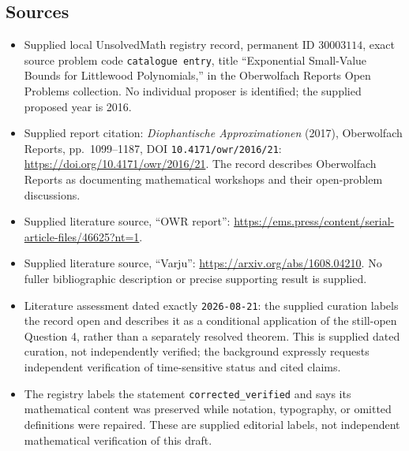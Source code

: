 \documentclass[11pt]{article}
\begin{document}
\subsection{Sources}
\begin{itemize}
\item Supplied local UnsolvedMath registry record, permanent ID \(30003114\), exact source problem code \texttt{catalogue entry}, title ``Exponential Small-Value Bounds for Littlewood Polynomials,'' in the Oberwolfach Reports Open Problems collection. No individual proposer is identified; the supplied proposed year is 2016.
\item Supplied report citation: \emph{Diophantische Approximationen} (2017), Oberwolfach Reports, pp.~1099--1187, DOI \texttt{10.4171/owr/2016/21}: \url{https://doi.org/10.4171/owr/2016/21}. The record describes Oberwolfach Reports as documenting mathematical workshops and their open-problem discussions.
\item Supplied literature source, ``OWR report'': \url{https://ems.press/content/serial-article-files/46625?nt=1}.
\item Supplied literature source, ``Varju'': \url{https://arxiv.org/abs/1608.04210}. No fuller bibliographic description or precise supporting result is supplied.
\item Literature assessment dated exactly \texttt{2026-08-21}: the supplied curation labels the record open and describes it as a conditional application of the still-open Question 4, rather than a separately resolved theorem. This is supplied dated curation, not independently verified; the background expressly requests independent verification of time-sensitive status and cited claims.
\item The registry labels the statement \texttt{corrected\_verified} and says its mathematical content was preserved while notation, typography, or omitted definitions were repaired. These are supplied editorial labels, not independent mathematical verification of this draft.
\end{itemize}
\end{document}
